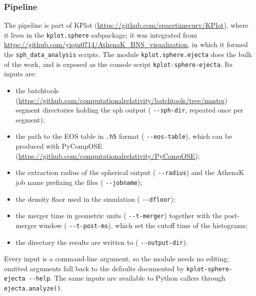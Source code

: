 \documentclass{article}
\newcommand{\var}[1]{%
  {\setlength{\fboxsep}{1.5pt}%
   \colorbox{varbg}{\textcolor{varfg}{\texttt{\small #1}}}}}
\begin{document}
\subsubsection*{Pipeline}
The pipeline is part of KPlot (\url{https://github.com/spacetimecurv/KPlot}), where it
lives in the \var{kplot.sphere} subpackage; it was integrated from
\url{https://github.com/yiqiu0714/AthenaK_BNS_visualization}, in which it formed the
\var{sph\_data\_analysis} scripts. The module \var{kplot.sphere.ejecta} does the bulk
of the work, and is exposed as the console script \var{kplot-sphere-ejecta}. Its
inputs are:
\begin{itemize}
  \item the batchtools (\url{https://github.com/computationalrelativity/batchtools/tree/master})
        segment directories holding the sph output (\var{-{}-sph-dir}, repeated once
        per segment);
  \item the path to the EOS table in \var{.h5} format (\var{-{}-eos-table}), which can
        be produced with PyCompOSE (\url{https://github.com/computationalrelativity/PyCompOSE});
  \item the extraction radius of the spherical output (\var{-{}-radius}) and the
        AthenaK job name prefixing the files (\var{-{}-jobname});
  \item the density floor used in the simulation (\var{-{}-dfloor});
  \item the merger time in geometric units (\var{-{}-t-merger}) together with the
        post-merger window (\var{-{}-t-post-ms}), which set the cutoff time of the
        histograms;
  \item the directory the results are written to (\var{-{}-output-dir}).
\end{itemize}
Every input is a command-line argument, so the module needs no editing; omitted
arguments fall back to the defaults documented by \var{kplot-sphere-ejecta -{}-help}.
The same inputs are available to Python callers through \var{ejecta.analyze()}.
\end{document}
